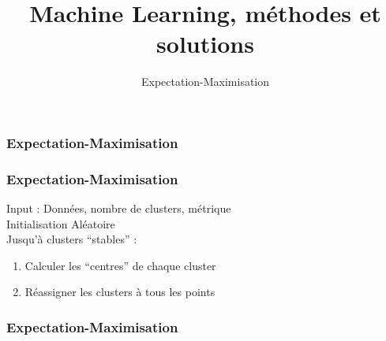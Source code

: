 \documentclass{formation}
\title{Machine Learning, méthodes et solutions}
\subtitle{Expectation-Maximisation}
\begin{document}
\maketitle


\begin{frame}
  \frametitle{Expectation-Maximisation}
\end{frame}

\begin{frame}
  \frametitle{Expectation-Maximisation}
  Input : Données, nombre de clusters, métrique \\
  Initialisation Aléatoire \\
  Jusqu'à clusters ``stables'' :\\
  \begin{enumerate}
  \item Calculer les ``centres'' de chaque cluster
  \item Réassigner les clusters à tous les points
  \end{enumerate}
\end{frame}

\begin{frame}
  \frametitle{Expectation-Maximisation}
\end{frame}
\end{document}
